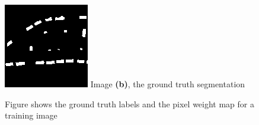 \documentclass{kththesis}
\begin{document}
\begin{figure}[H]
  \includegraphics[width=\linewidth]{trees_label}
  Image \textbf{(b)}, the ground truth segmentation
\endminipage\hfill
\caption{Figure shows the ground truth labels and the pixel weight map for a training image}
\end{figure}
\end{document}
